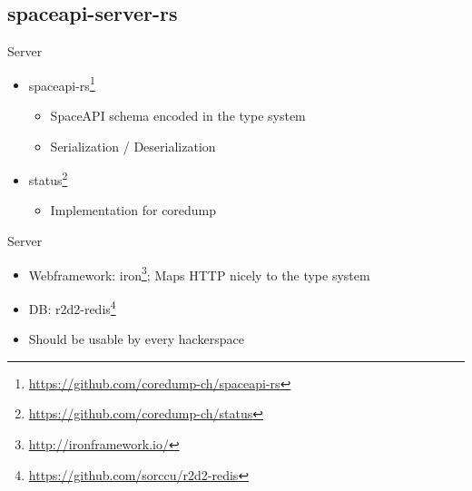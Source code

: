 \subsection{spaceapi-server-rs}

\begin{frame}[c]{Server}
    \begin{itemize}
        \item spaceapi-rs\footnote{\url{https://github.com/coredump-ch/spaceapi-rs}}
            \begin{itemize}
                \item SpaceAPI schema encoded in the type system
                \item Serialization / Deserialization
            \end{itemize}
        \item status\footnote{\url{https://github.com/coredump-ch/status}}
            \begin{itemize}
                \item Implementation for coredump
            \end{itemize}
    \end{itemize}
\end{frame}

\begin{frame}[c]{Server}
    \begin{itemize}
        \item Webframework: iron\footnote{\url{http://ironframework.io/}};
            Maps HTTP nicely to the type system
        \item DB: r2d2-redis\footnote{\url{https://github.com/sorccu/r2d2-redis}}
        \item Should be usable by every hackerspace
    \end{itemize}
\end{frame}

